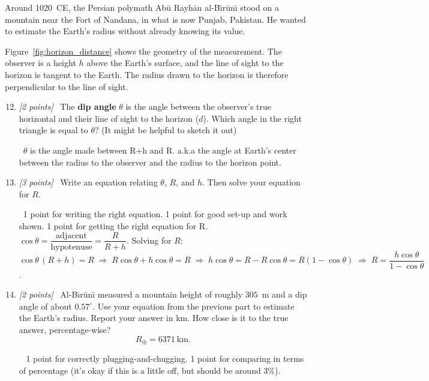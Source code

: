 \documentclass[11pt]{article}
\newcommand{\pts}[1]{\textit{[#1 points]}\ }
\newcommand{\ans}[1]{%
  \par\smallskip\noindent{\color{blue!55!black}\textbf{Answer:}}\ #1\par\smallskip}
\begin{document}
Around 1020~CE, the Persian polymath Ab\=u Rayh\=an al-B\={\i}r\=un\={\i}
stood on a mountain near the Fort of Nandana, in what is now Punjab,
Pakistan. He wanted to estimate the Earth's radius without already knowing
its value.

Figure~\ref{fig:horizon_distance} shows the geometry of the measurement.
The observer is a height $h$ above the Earth's surface, and the line of
sight to the horizon is tangent to the Earth. The radius drawn to the
horizon is therefore perpendicular to the line of sight.

\begin{enumerate}
    \setcounter{enumi}{11}

    \item \pts{2} The \textbf{dip angle} $\theta$ is the angle between the
    observer's true horizontal and their line of sight to the horizon ($d$). Which angle in the right
    triangle is equal to $\theta$? (It might be helpful to sketch it out)

    \ans{$\theta$ is the angle made between R+h and R.  a.k.a the angle at
    Earth's center between the radius to the observer and the radius to the
    horizon point.}

    \item \pts{3} Write an equation
    relating $\theta$, $R$, and $h$. Then solve your equation
    for $R$.

    \ans{1 point for writing the right equation. 1 point for good set-up and work shown. 1 point for getting the right equation for R. \\ $\cos\theta = \dfrac{\text{adjacent}}
    {\text{hypotenuse}} = \dfrac{R}{R+h}$. Solving for
    $R$: $\cos\theta\,(R+h) = R \;\Rightarrow\; R\cos\theta + h\cos\theta =
    R \;\Rightarrow\; h\cos\theta = R - R\cos\theta = R(1-\cos\theta)
    \;\Rightarrow\; R = \dfrac{h\cos\theta}{1-\cos\theta}$.}

    \item \pts{2} Al-B\={\i}r\=un\={\i} measured a mountain height of roughly
    $305$~m and a dip angle of about $0.57^\circ$. Use your equation from
    the previous part to estimate the Earth's radius. Report your answer
    in km. How close is it to the true answer, percentage-wise?
    \[
        R_\oplus = 6371~\mathrm{km}.
    \]

    \ans{ 1 point for correctly plugging-and-chugging. 1 point for comparing in terms of percentage (it's okay if this is a little off, but should be around 3\%). \\
    
}
\end{enumerate}
\end{document}
